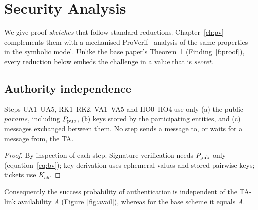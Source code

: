 \chapter{Security Analysis}\label{sec:security}
We give proof \emph{sketches} that follow standard reductions; Chapter~\ref{ch:pv} complements them with a mechanised ProVerif~\cite{proverif}
analysis of the same properties in the symbolic model. Unlike the base paper's Theorem~1 (Finding~\ref{f:proof}), every reduction below embeds the challenge in a value that
is \emph{secret}.

\section{Authority independence}
\begin{proposition}[No online TA]\label{prop:indep}
Steps UA1--UA5, RK1--RK2, VA1--VA5 and HO0--HO4 use only (a) the public $\mathit{params}$, including $P_{\mathrm{pub}}$, (b) keys stored by the participating
entities, and (c) messages exchanged between them. No step sends a message to, or waits for a message from, the TA.
\end{proposition}
\begin{proof}
By inspection of each step. Signature verification needs $P_{\mathrm{pub}}$ only (equation~\eqref{eq:bv}); key derivation uses ephemeral values and stored pairwise keys; tickets use $K_{ab}$.
\end{proof}
\noindent Consequently the success probability of authentication is independent of the TA-link availability $A$ (Figure~\ref{fig:avail}), whereas for the base scheme it equals $A$.

